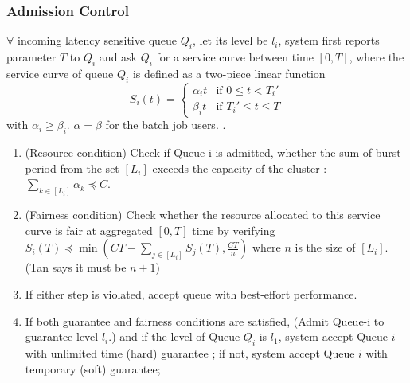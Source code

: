 \subsubsection*{Admission Control}
$\forall$ incoming latency sensitive queue $Q_i$, let its level be $l_i$, system first reports parameter $T$ to $Q_i$ and ask $Q_i$ for a service curve between time $[0,T]$, where the service curve of queue $Q_i$ is defined as a two-piece linear function $$ S_i(t) = \begin{cases} \alpha_i t &\mbox{if } 0 \leq t < T_i' \\ 
\beta_i t & \mbox{if } T_i' \leq t \leq T  \end{cases} $$ with $\alpha_i \geq \beta_i$. $\alpha=\beta$ for the batch job users. .
\begin{enumerate}
	\item  (Resource condition) Check if Queue-i is admitted, whether the sum of burst period from the set $[L_i]$ exceeds the capacity of the cluster : $\sum_{k \in [L_i]}  \alpha_k \preceq C $. 
	\item  (Fairness condition) Check whether the resource allocated to this service curve is fair at aggregated $[0,T]$ time by verifying $S_i(T) \preceq \min(CT-\sum_{j \in [L_i]} S_j(T),\frac{CT}{n})$ where $n$ is the size of $[L_i]$. (Tan says it must be $n+1$)
	\item If either step is violated, accept queue with best-effort performance.
	\item If both guarantee and fairness conditions are satisfied, (Admit Queue-i to guarantee level $l_i$.) and if the level of Queue $Q_i$  is $l_1$, system accept Queue $i$ with unlimited time (hard) guarantee ; if not, system accept Queue $i$ with temporary (soft) guarantee;

\end{enumerate}

